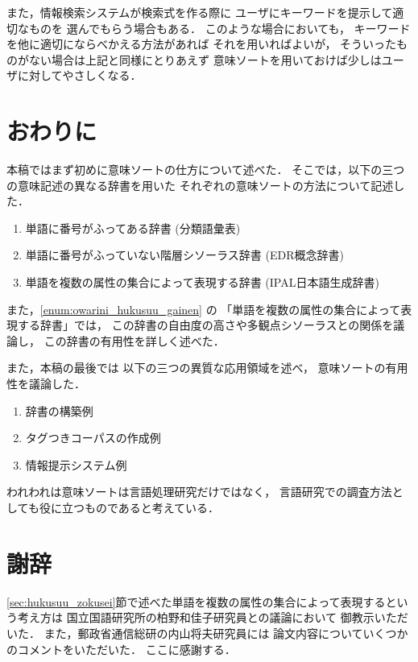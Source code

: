 また，情報検索システムが検索式を作る際に
ユーザにキーワードを提示して適切なものを
選んでもらう場合もある\cite{tsuda94A}．
このような場合においても，
キーワードを他に適切にならべかえる方法があれば
それを用いればよいが，
そういったものがない場合は上記と同様にとりあえず
意味ソートを用いておけば少しはユーザに対してやさしくなる．

\section{おわりに}

本稿ではまず初めに意味ソートの仕方について述べた．
そこでは，以下の三つの意味記述の異なる辞書を用いた
それぞれの意味ソートの方法について記述した．
\begin{enumerate}
\item 
  単語に番号がふってある辞書 (分類語彙表)
\item 
  単語に番号がふっていない階層シソーラス辞書 (EDR概念辞書)
\item 
  \label{enum:owarini_hukusuu_gainen}
  単語を複数の属性の集合によって表現する辞書 (IPAL日本語生成辞書)
\end{enumerate}
また，\ref{enum:owarini_hukusuu_gainen} の
「単語を複数の属性の集合によって表現する辞書」では，
この辞書の自由度の高さや多観点シソーラスとの関係を議論し，
この辞書の有用性を詳しく述べた．

また，本稿の最後では
以下の三つの異質な応用領域を述べ，
意味ソートの有用性を議論した．
\begin{enumerate}
\item 
  辞書の構築例
\item 
  タグつきコーパスの作成例
\item 
  情報提示システム例
\end{enumerate}

われわれは意味ソートは言語処理研究だけではなく，
言語研究での調査方法としても役に立つものであると考えている．

\section*{謝辞}

\ref{sec:hukusuu_zokusei}節で述べた単語を複数の属性の集合によって表現するという考え方は
国立国語研究所の柏野和佳子研究員との議論において
御教示いただいた．
また，郵政省通信総研の内山将夫研究員には
論文内容についていくつかのコメントをいただいた．
ここに感謝する．





